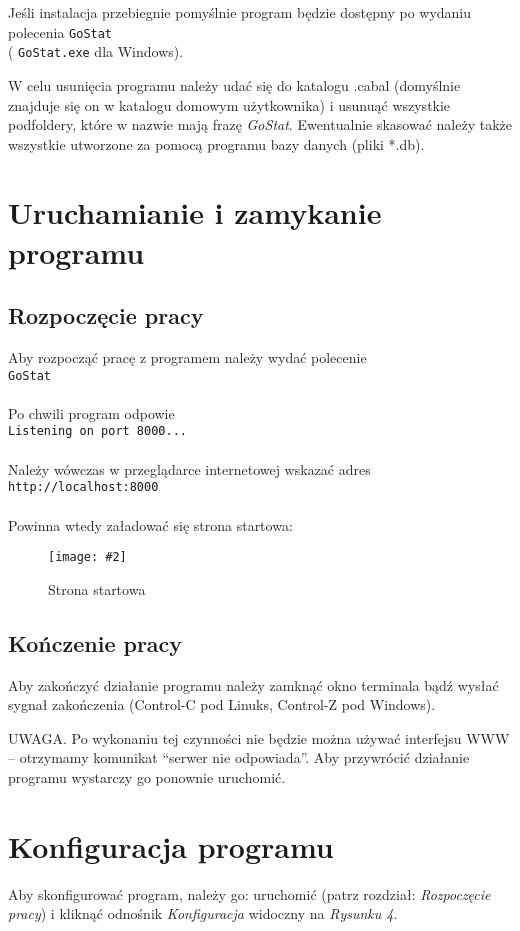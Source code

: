 \documentclass[10pt,leqno]{article}
\newcommand{\myimage}[3]{
  \begin{figure}[h!]
    \centering
      \texttt{[image: \#2]}
  \caption{#3}
  \end{figure}
}
\newcommand{\cmd}[1]{
  \texttt{#1}
}
\begin{document}
Jeśli instalacja przebiegnie pomyślnie program będzie dostępny po wydaniu polecenia \cmd{GoStat} \\
(\cmd{GoStat.exe} dla Windows).

W celu usunięcia programu należy udać się do katalogu .cabal (domyślnie znajduje się on w katalogu domowym użytkownika) i usunuąć wszystkie
podfoldery, które w nazwie mają frazę \emph{GoStat}. Ewentualnie skasować należy także wszystkie utworzone za pomocą programu bazy danych (pliki *.db).

\newpage

\section{Uruchamianie i zamykanie programu}

\subsection{Rozpoczęcie pracy}
Aby rozpocząć pracę z programem należy wydać polecenie \\
\cmd{GoStat} \\ 
\\
Po chwili program odpowie \\
\cmd{Listening on port 8000...} \\
\\
Należy wówczas w przeglądarce internetowej wskazać adres \\
\cmd{http://localhost:8000} \\
\\
Powinna wtedy załadować się strona startowa:

\myimage{0.4}{start.png}{Strona startowa}

\subsection{Kończenie pracy}
Aby zakończyć działanie programu należy zamknąć okno terminala bądź wysłać sygnał zakończenia (Control-C pod Linuks, Control-Z pod Windows).

UWAGA. Po wykonaniu tej czynności nie będzie można używać interfejsu WWW -- otrzymamy komunikat ``serwer nie odpowiada''. Aby przywrócić działanie programu
wystarczy go ponownie uruchomić.


\newpage

\section{Konfiguracja programu}
Aby skonfigurować program, należy go: uruchomić (patrz rozdział: \emph{Rozpoczęcie pracy}) i kliknąć odnośnik \emph{Konfiguracja} 
widoczny na \emph{Rysunku 4}.
\end{document}
